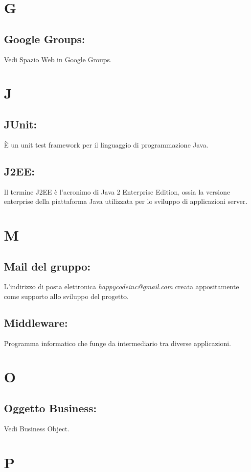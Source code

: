 \documentclass[11pt,titlepage,a4paper]{report}
\begin{document}
\chapter{G}
\section{Google Groups:}
Vedi Spazio Web in Google Groups.

\chapter{J}
\section{JUnit:}
\`E un unit test framework per il linguaggio di programmazione Java.
\section{J2EE:}
Il termine J2EE \`e l'acronimo di Java 2 Enterprise Edition, ossia la versione enterprise della piattaforma Java utilizzata per lo sviluppo di applicazioni server.

\chapter{M}
\section{Mail del gruppo:}
L'indirizzo di posta elettronica \textit{happycodeinc@gmail.com} creata appositamente come supporto allo sviluppo del progetto.
\section{Middleware:}
Programma informatico che funge da intermediario tra diverse applicazioni.

\chapter{O}
\section{Oggetto Business:}
Vedi Business Object.

\chapter{P}
\end{document}
